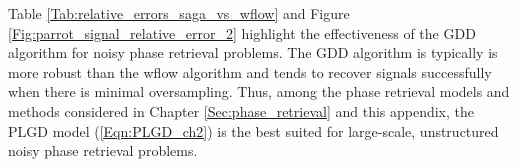 Table \ref{Tab:relative_errors_saga_vs_wflow} and Figure \ref{Fig:parrot_signal_relative_error_2} highlight the effectiveness of the GDD algorithm for noisy phase retrieval problems.  
The GDD algorithm is typically is more robust than the wflow algorithm and tends to recover signals successfully when there is minimal oversampling. 
Thus, among the phase retrieval models and methods considered in Chapter \ref{Sec:phase_retrieval} and this appendix, the PLGD model (\ref{Eqn:PLGD_ch2}) is the best suited for large-scale, unstructured noisy phase retrieval problems.

